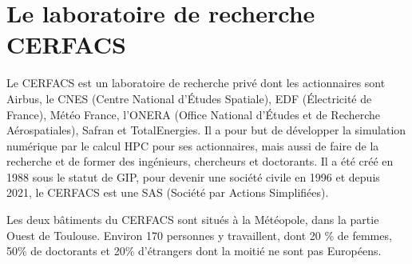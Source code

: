 \chapter{Le laboratoire de recherche CERFACS}





Le CERFACS est un laboratoire de recherche privé dont les actionnaires sont\label{actionnaires} Airbus, le CNES (Centre National d'Études Spatiale), EDF (Électricité de France), Météo France, l'ONERA (Office National d'Études et de Recherche Aérospatiales), Safran et TotalEnergies. Il a pour but de développer la simulation numérique par le calcul HPC pour ses actionnaires, mais aussi de faire de la recherche et de former des ingénieurs, chercheurs et doctorants. Il a été créé en 1988 sous le statut de \ac{GIP}, pour devenir une société civile en 1996 et depuis 2021, le CERFACS est une SAS (Société par Actions Simplifiées).

\vspace{0,5cm}

Les deux bâtiments du CERFACS sont situés à la Météopole, dans la partie Ouest de Toulouse. Environ 170 personnes y travaillent, dont 20 \% de femmes, 50\% de doctorants et 20\% d'étrangers dont la moitié ne sont pas Européens.


